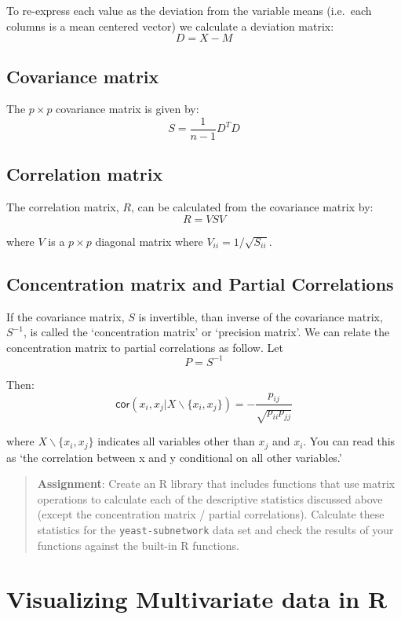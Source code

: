 \documentclass{article}
\begin{document}
To re-express each value as the deviation from the variable means
(i.e.~each columns is a mean centered vector) we calculate a deviation
matrix: \[
D = X - M
\]

\subsection{Covariance matrix}

The $p \times p$ covariance matrix is given by: \[
S = \frac{1}{n-1} D^T D
\]

\subsection{Correlation matrix}

The correlation matrix, $R$, can be calculated from the covariance
matrix by: \[
R = V S V
\]

where $V$ is a $p \times p$ diagonal matrix where
$V_{ii} = 1/\sqrt{S_{ii}}$.

\subsection{Concentration matrix and Partial Correlations}

If the covariance matrix, $S$ is invertible, than inverse of the
covariance matrix, $S^{-1}$, is called the `concentration matrix' or
`precision matrix'. We can relate the concentration matrix to partial
correlations as follow. Let \[
P = S^{-1}
\]

Then:
\[\mathsf{cor}(x_i,x_j|X\backslash\{x_i,x_j\}) = -\frac{p_{ij}}{\sqrt{p_{ii} p_{jj}}}
\]

where $X \backslash \{x_i,x_j\}$ indicates all variables other than
$x_j$ and $x_i$. You can read this as `the correlation between x and y
conditional on all other variables.'

\begin{quote}
\textbf{Assignment}: Create an R library that includes functions that
use matrix operations to calculate each of the descriptive statistics
discussed above (except the concentration matrix / partial
correlations). Calculate these statistics for the
\lstinline!yeast-subnetwork! data set and check the results of your
functions against the built-in R functions.

\end{quote}
\section{Visualizing Multivariate data in R}
\end{document}
